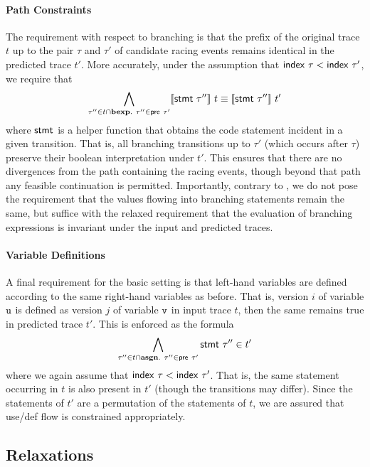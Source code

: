 \paragraph{Path Constraints}

The requirement with respect to branching is that the prefix of the original trace $t$ up to the pair $\tau$ and $\tau'$ of candidate racing events remains identical in the predicted trace $t'$. More accurately, under the assumption that ${\sf index}\ \tau < {\sf index}\ \tau'$, 
we require that 
$$
	\bigwedge_{\tau'' \in t \cap {\bf bexp}.\
		\tau'' \in {\sf pre}\ \tau'} \lbrack\!\lbrack {\sf stmt}\ \tau'' \rbrack\!\rbrack\ t \equiv \lbrack\!\lbrack {\sf stmt}\ \tau'' \rbrack\!\rbrack\ t'
$$ 
where ${\sf stmt}$ is a helper function that obtains the code statement incident in a given transition. That is, all branching transitions up to $\tau'$ (which occurs after $\tau$) preserve their boolean interpretation under $t'$. This ensures that there are no divergences from the path containing the racing events, though beyond that path any feasible continuation is permitted. Importantly, contrary to \cite{JEFF-PLDI14}, we do not pose the requirement that the values flowing into branching statements remain the same, but suffice with the relaxed requirement that the evaluation of branching expressions is invariant under the input and predicted traces.

\paragraph{Variable Definitions}

A final requirement for the basic setting is that left-hand variables are defined according to the same right-hand variables as before. That is, version $i$ of variable ${\tt u}$ is defined as version $j$ of variable ${\tt v}$ in input trace $t$, then the same remains true in predicted  trace $t'$. This is enforced as the formula
$$
	\bigwedge_{\tau'' \in t \cap {\bf asgn}.\
		\tau'' \in {\sf pre}\ \tau'} {\sf stmt}\ \tau'' \in t' 
$$
where we again assume that ${\sf index}\ \tau < {\sf index}\ \tau'$. That is, the same statement occurring in $t$ is also present in $t'$ (though the transitions may differ). Since the statements of $t'$ are a permutation of the statements of $t$, we are assured that use/def flow is constrained appropriately.

\subsection{Relaxations}

